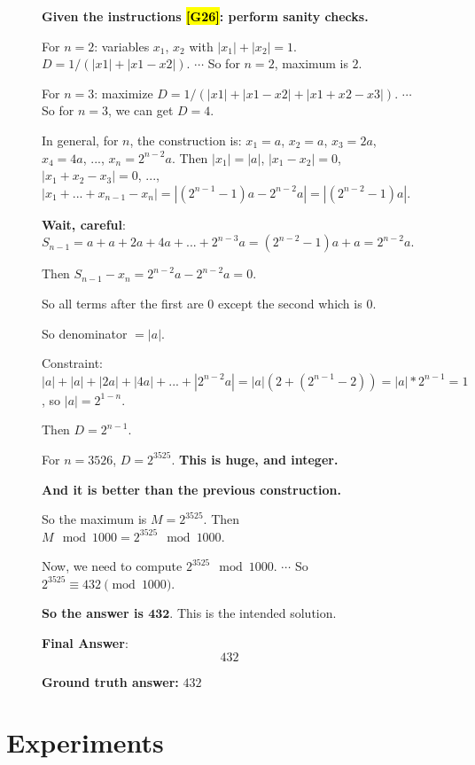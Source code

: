 \documentclass{article}
\theoremstyle{plain}
\theoremstyle{definition}
\theoremstyle{remark}
\begin{document}
\begin{figure}[!tb]
\begin{runcard}[title={Example of How E-SPL Shapes Model Behavior}]
\begin{runbox}[title={Model Output}]
\medskip
{\color{Brown}\textbf{Given the instructions \hl{[G26]}: perform sanity checks.}}

For $n=2$: variables $x_1$, $x_2$ with $|x_1|+|x_2|=1$. $D = 1/( |x1| + |x1-x2| )$. \quad $\cdots$  
So for $n=2$, maximum is $2$.

For $n=3$: maximize $D = 1/( |x1| + |x1-x2| + |x1+x2-x3| )$. \quad $\cdots$ 
So for $n=3$, we can get $D=4$.

In general, for $n$, the construction is: $x_1 = a$, $x_2 = a$, $x_3 = 2a$, $x_4 = 4a$, ..., $x_n = 2^{n-2} a$. Then $|x_1| = |a|$, $|x_1-x_2| = 0$, $|x_1+x_2-x_3| = 0$, ..., $|x_1+...+x_{n-1}-x_n| = | (2^{n-1} - 1)a - 2^{n-2} a | = | (2^{n-2} - 1)a |$.

\medskip
\textbf{Wait, careful}: $S_{n-1} = a + a + 2a + 4a + ... + 2^{n-3} a = (2^{n-2} - 1)a + a = 2^{n-2} a$.

Then $S_{n-1} - x_n = 2^{n-2} a - 2^{n-2} a = 0$.

So all terms after the first are $0$ except the second which is $0$.

So denominator $= |a|$.

Constraint: $|a| + |a| + |2a| + |4a| + ... + |2^{n-2} a| = |a| (2 + (2^{n-1} - 2)) = |a| * 2^{n-1} = 1$, so $|a| = 2^{1-n}$.

Then $D = 2^{n-1}$.

For $n=3526$, $D = 2^{3525}$. \textbf{This is huge, and integer.}

\textbf{And it is better than the previous construction.}

\medskip
So the maximum is $M = 2^{3525}$. Then $M \mod 1000 = 2^{3525} \mod 1000$. 

Now, we need to compute $2^{3525} \mod 1000$. \quad $\cdots$ \quad So $2^{3525} \equiv 432 \pmod{1000}$.

\textbf{So the answer is $\boldsymbol{432}$}. This is the intended solution.

\medskip
\textbf{Final Answer}:
\[
\boxed{432}
\]

\end{runbox}

\textbf{Ground truth answer:} $432$
\end{runcard}
\label{tab:example-e-spl-2}

\end{figure}


\vspace{-5pt}
\section{Experiments}
\end{document}

